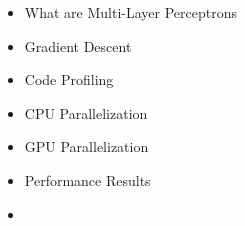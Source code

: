 \begin{frame}
\begin{itemize}
    \item What are Multi-Layer Perceptrons
    \item Gradient Descent
    \item Code Profiling
    \item CPU Parallelization
    \item GPU Parallelization
    \item Performance Results 
    \item \textbf{\color{red}{Next Steps}}
\end{itemize}
\end{frame}


